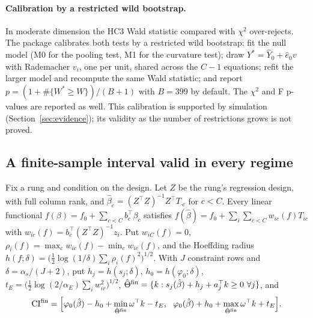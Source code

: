 \paragraph{Calibration by a restricted wild bootstrap.} In moderate dimension the
HC3 Wald statistic compared with $\chi^2$ over-rejects. The package calibrates
both tests by a restricted wild bootstrap: fit the null model (M0 for the pooling
test, M1 for the curvature test); draw $Y^*=\hat Y_0+\hat e_0v$ with Rademacher
$v_i$, one per unit, shared across the $C-1$ equations; refit the larger model and
recompute the same Wald statistic; and report
$p=(1+\#\{W^*\ge W\})/(B+1)$ with $B=399$ by default. The $\chi^2$ and F p-values are
reported as well. This calibration is supported by simulation
(Section~\ref{sec:evidence}); its validity as the number of restrictions grows is
not proved.

\subsection{A finite-sample interval valid in every regime}

Fix a rung and condition on the design. Let $Z$ be the rung's regression design,
with full column rank, and $\hat\beta_c=(Z^\top Z)^{-1}Z^\top T_{\cdot c}$ for
$c<C$. Every linear functional $f(\beta)=f_0+\sum_{c<C}b_c^\top\beta_c$ satisfies
$f(\hat\beta)=f_0+\sum_i\sum_{c<C}w_{ic}(f)T_{ic}$ with
$w_{ic}(f)=b_c^\top(Z^\top Z)^{-1}z_i$. Put $w_{iC}(f)=0$,
$\rho_i(f)=\max_cw_{ic}(f)-\min_cw_{ic}(f)$, and the Hoeffding radius
$h(f;\delta)=\big(\tfrac12\log(1/\delta)\sum_i\rho_i(f)^2\big)^{1/2}$. With $J$
constraint rows and $\delta=\alpha_s/(J+2)$, put $h_j=h(s_j;\delta)$,
$h_0=h(\varphi_0;\delta)$, $t_E=\big(\tfrac12\log(2/\alpha_E)\sum_iw_{ir}^2\big)^{1/2}$,
$\hat\Theta^{\rm fin}=\{k:s_j(\hat\beta)+h_j+a_j^\top k\ge0\ \forall j\}$, and
\[
\mathrm{CI}^{\rm fin}=\Big[\varphi_0(\hat\beta)-h_0+\min_{\hat\Theta^{\rm fin}}\omega^\top k-t_E,\ \
\varphi_0(\hat\beta)+h_0+\max_{\hat\Theta^{\rm fin}}\omega^\top k+t_E\Big].
\]

